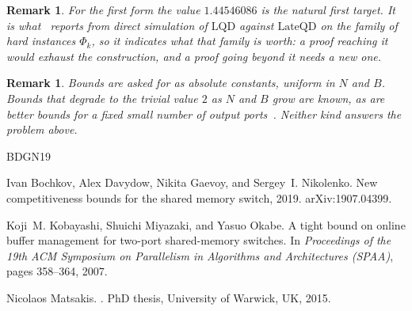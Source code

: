 \documentclass[10pt]{article}
\newtheorem{remark}[theorem]{Remark}
\newcommand{\LQD}{\text{LQD}}
\newcommand{\LateQD}{\text{LateQD}}
\begin{document}
\begin{remark}\label{rem:target}
For the first form the value $1.44546086$ is the natural first target. It is
what~\cite{BDGN19} reports from direct simulation of $\LQD$ against $\LateQD$
on the family of hard instances $\Phi_k$, so it indicates what that family is
worth: a proof reaching it would exhaust the construction, and a proof going
beyond it needs a new one.
\end{remark}

\begin{remark}\label{rem:uniform}
Bounds are asked for as absolute constants, uniform in $N$ and $B$. Bounds that
degrade to the trivial value $2$ as $N$ and $B$ grow are known, as are better
bounds for a fixed small number of output ports~\cite{KMO07,Matsakis15}.
Neither kind answers the problem above.
\end{remark}

\begin{thebibliography}{BDGN19}

Ivan Bochkov, Alex Davydow, Nikita Gaevoy, and Sergey~I. Nikolenko.
\newblock New competitiveness bounds for the shared memory switch, 2019.
\newblock arXiv:1907.04399.

Koji~M. Kobayashi, Shuichi Miyazaki, and Yasuo Okabe.
\newblock A tight bound on online buffer management for two-port shared-memory
  switches.
\newblock In {\em Proceedings of the 19th ACM Symposium on Parallelism in
  Algorithms and Architectures (SPAA)}, pages 358--364, 2007.

Nicolaos Matsakis.
.
\newblock PhD thesis, University of Warwick, UK, 2015.

\end{thebibliography}
\end{document}

